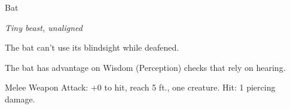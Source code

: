 \begin{monsterbox}{Bat}
\begin{hangingpar}
\textit{Tiny beast, unaligned}
\end{hangingpar}
\dndline%
\basics[%
armorclass = 12,
hitpoints = 1d4 - 1,
speed = {5 ft., fly 30 ft.}
]
\dndline%
\stats[%
STR = \stat{2},
DEX = \stat{15},
CON = \stat{8},
INT = \stat{2},
WIS = \stat{12},
CHA = \stat{4}
]
\dndline%
\details[%
skills={},
damageimmunities={},
savingthrows={},
conditionimmunities={},
damageresistances={},
damagevulnerabilities={},
senses={blindsight 60 ft., passive Perception 11},
challenge=0
]
\dndline%
\begin{monsteraction}[Echolocation]
The bat can't use its blindsight while deafened.
\end{monsteraction}
\begin{monsteraction}
The bat has advantage on Wisdom (Perception) checks that rely on hearing.
\end{monsteraction}
\begin{monsteraction}[Bite]
Melee Weapon Attack: +0 to hit, reach 5 ft., one creature. Hit: 1 piercing damage.
\end{monsteraction}
\end{monsterbox}